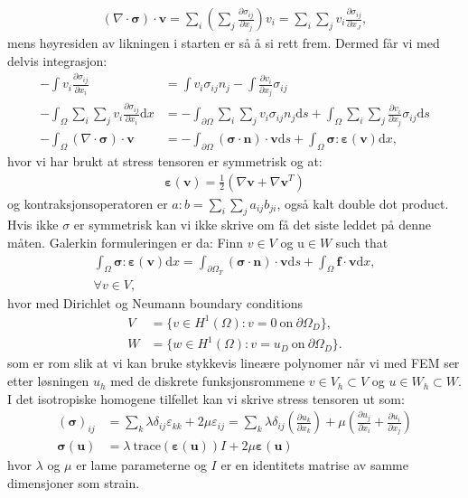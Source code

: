 \documentclass[a4paper]{article}
\begin{document}
\begin{align*}
(\nabla \cdot \boldsymbol{\sigma})\cdot \boldsymbol{v} = \sum_i (\sum_{j} \frac{\partial \sigma_{ij}}{\partial x_j})v_i  = \sum_i \sum_j v_i\frac{\partial \sigma_{ij}}{\partial x_J},
\end{align*}
mens høyresiden av likningen i starten er så å si rett frem. Dermed får vi med delvis integrasjon:
\begin{align*}
-\int v_i\frac{\partial\sigma_{ij}}{\partial x_i} &= \int v_i \sigma_{ij}n_j - \int \frac{\partial v_i}{\partial x_j}\sigma_{ij}\\
-\int_{\Omega}\sum_i\sum_j  v_i\frac{\partial \sigma_{ij}}{\partial x_i} \mathrm{d}x &= -\int_{\partial\Omega}\sum_i\sum_j v_i \sigma_{ij}n_j \mathrm{d}s + \int_{\Omega}\sum_{i}\sum_{j}\frac{\partial v_i}{\partial x_j}\sigma_{ij} \mathrm{d}s\\
-\int_{\Omega}(\nabla \cdot \boldsymbol{\sigma})\cdot \boldsymbol{v} &= - \int_{\partial\Omega} (\boldsymbol{\sigma}\cdot\boldsymbol{n})  \cdot \boldsymbol{v}\mathrm{d}s + \int_{ \Omega} \boldsymbol{\sigma}:\boldsymbol{\varepsilon(v)} \mathrm{d}x,
\end{align*}
hvor vi har brukt at stress tensoren er symmetrisk og at:
\begin{align*}
\boldsymbol{\varepsilon(v)} = \frac{1}{2}(\nabla\boldsymbol{v}+\nabla\boldsymbol{v}^T)
\end{align*}
og kontraksjonsoperatoren er $a : b = \sum_i\sum_j a_{ij}b_{ji}$, også kalt double dot product. Hvis ikke $\sigma$ er symmetrisk kan vi ikke skrive om få det siste leddet på denne måten. Galerkin formuleringen er da: Finn $v\in V$ og u$\in W$ such that
\begin{align*}
\int_{ \Omega} \boldsymbol{\sigma}:\boldsymbol{\varepsilon(v)} \mathrm{d}x = \int_{\partial\Omega_T} (\boldsymbol{\sigma}\cdot\boldsymbol{n})  \cdot \boldsymbol{v}\mathrm{d}s + \int_{\Omega}\boldsymbol{f}\cdot \boldsymbol{v}\mathrm{d}x, \\ \forall v\in V,
\end{align*}
hvor med Dirichlet og Neumann boundary conditions
\begin{align*}
V &= \{v \in H^1(\Omega) : v = 0 \ \mathrm{on} \ \partial\Omega_D \},\\
W &= \{w \in H^1(\Omega) : v = u_D \ \mathrm{on} \ \partial\Omega_D\}.
\end{align*}
som er rom slik at vi kan bruke stykkevis lineære polynomer når vi med FEM ser etter løsningen $u_h$ med de diskrete funksjonsrommene $v\in V_h \subset V$ og $u \in W_h \subset W$.
I det isotropiske homogene tilfellet kan vi skrive stress tensoren ut som:
\begin{align*}
(\boldsymbol{\sigma})_{ij} &= \sum_k \lambda\delta_{ij}\varepsilon_{kk} +2\mu\varepsilon_{ij} = \sum_k\lambda\delta_{ij}(\frac{\partial u_k}{\partial x_k})+\mu(\frac{\partial u_j}{\partial x_i}+\frac{\partial u_i}{\partial x_j})\\
\boldsymbol{\sigma(u)} &= \lambda\  \mathrm{trace}(\boldsymbol{\varepsilon(u)})I+2\mu\boldsymbol{\varepsilon(u)}
\end{align*}
hvor $\lambda$ og $\mu$ er lame parameterne og $I$ er en identitets matrise av samme dimensjoner som strain. 
\end{document}
